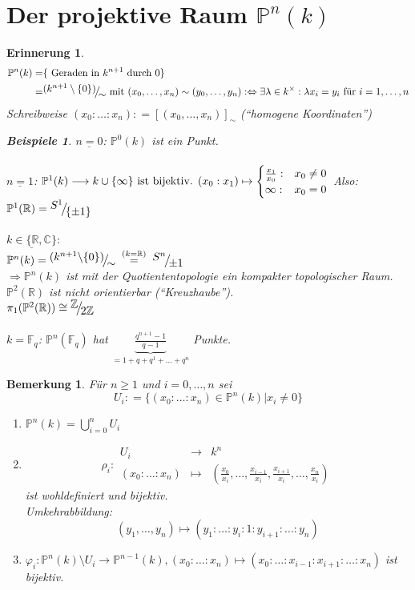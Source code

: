 \documentclass[a4paper,12pt]{report}
\theoremstyle{break}
\newtheorem{Bem}[Def]{Bemerkung}
\theoremstyle{nonumberbreak}
\newtheorem{nnBsp}{Beispiele}
\newtheorem{Eri}{Erinnerung}
\theoremstyle{nonumberplain}
\newcommand{\defeqr}[0]{\mathrel{\mathop:}=}
\newcommand{\gleichwegen}[1]{\ensuremath{\DOTSB\;\stackrel{#1}{=}\;}}
\newcommand{\Abb}[5]{\ensuremath{#1:\begin{array}{ccc} #2 & \longrightarrow & #3 \\ #4 & \longmapsto & #5 \end{array}}}
\newcommand{\FakRaum}[2]{
  \raisebox{0.7ex}{\ensuremath{#1}}
  \ensuremath{\mkern-3mu}\big/\ensuremath{\mkern-3mu}
  \raisebox{-0.6ex}{\ensuremath{#2}}}
\begin{document}
\section{Der projektive Raum $\mathbb P^n(k)$}
\begin{Eri}
  \begin{align*}
  \mathbb P^n(k)=& \{ \text{ Geraden in $k^{n+1}$ durch $0$} \}     \\
 =&\FakRaum{(k^{n+1}\setminus\{0\})}{\sim}\text{ mit }(x_0,\dots,x_n)\sim(y_0,\dots,y_n):\Leftrightarrow\exists\lambda\in k^\times:\lambda x_i=y_i\text{ für } i=1,\dots,n
  \end{align*}
Schreibweise $(x_0:\dots:x_n)\defeqr [(x_0,\dots,x_n)]_\sim$ (``homogene Koordinaten'')
\begin{nnBsp}
  $\underline{n=0}$: $\mathbb P^0(k)$ ist ein Punkt.\\\\
  $\underline{n=1}$:
 $\mathbb P^1(k)\longrightarrow  k \cup \{ \infty \} \text{ ist bijektiv. } \\
(x_0:x_1) \mapsto  
\begin{cases}
  \frac{x_1}{x_0}:&x_0\neq 0 \\
\infty:&x_0=0
\end{cases} $
Also: $\mathbb P^1(\mathbb R)=\FakRaum{S^1}{\{ \pm 1\} }$\\\\
$\underline{k\in\{\mathbb R, \mathbb C\}}:$\\
$\mathbb P^n(k)=\FakRaum{(k^{n+1}\backslash \{0\})}{\sim}\gleichwegen{(k=\mathbb R)}\FakRaum{S^n}{\pm 1}$ \\
$\Rightarrow\mathbb P^n(k)$ ist mit der Quotiententopologie ein kompakter topologischer Raum. \\
$\mathbb P^2(\mathbb R)$ ist nicht orientierbar (``Kreuzhaube''). \\
$\pi_1(\mathbb P^2(\mathbb R))\cong \FakRaum{\mathbb Z}{2\mathbb Z}$ \\\\
\underline{$k=\mathbb F_q$}: $\mathbb P^n(\mathbb F_q)$ hat $\underbrace{\frac{q^{n+1}-1}{q-1}}_{=1+q+q^1+\dots+q^n}$ Punkte.
\end{nnBsp}
\end{Eri}
\begin{Bem}
  Für $n\geq 1$ und $i=0,\dots,n$ sei 
\[
U_i\defeqr\{(x_0:\dots:x_n)\in\mathbb P^n(k)\vert x_i\neq 0 \}
\]
\begin{enumerate}
\item $\mathbb P^n(k)=\bigcup_{i=0}^n U_i$
\item \[
\Abb{\rho_i}{U_i}{k^n}{(x_0:\dots:x_n)}{(\frac{x_0}{x_i},\dots,\frac{x_{i-1}}{x_i},\frac{x_{i+1}}{x_i},\dots,\frac{x_n}{x_i})}
\]
ist wohldefiniert und bijektiv. \\ Umkehrabbildung: 
\[ 
(y_1,\dots,y_n)\mapsto (y_1:\dots:y_i:1:y_{i+1}:\dots:y_n)
\]

\item $\varphi_i:\mathbb P^n(k)\setminus U_i\longrightarrow \mathbb P^{n-1}(k),(x_0:\dots:x_n)\mapsto(x_0:\dots:x_{i-1}:x_{i+1}:\dots:x_n)$ ist bijektiv.
\end{enumerate}
\end{Bem}
\end{document}
